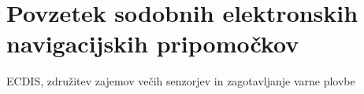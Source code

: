 %
\chapter{Povzetek sodobnih elektronskih navigacijskih pripomočkov}
\label{intro} %

ECDIS, združitev zajemov večih senzorjev in zagotavljanje varne plovbe


